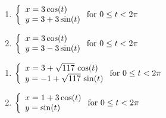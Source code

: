 \documentclass{ximera}
\begin{document}
\begin{multicols}{2}

\begin{enumerate}

\setcounter{enumi}{\value{HW}}

\item   ${\displaystyle \left\{ \begin{array}{l} x = 3\cos(t) \\ y = 3 + 3\sin(t)  \end{array} \right. \vspace{.25in} \mbox{for } 0 \leq t < 2\pi}$

\item   ${\displaystyle \left\{ \begin{array}{l} x = 3\cos(t) \\ y = 3 - 3\sin(t)  \end{array} \right. \vspace{.25in} \mbox{for } 0 \leq t < 2\pi }$

\setcounter{HW}{\value{enumi}}

\end{enumerate}

\end{multicols}



\begin{multicols}{2}

\begin{enumerate}

\setcounter{enumi}{\value{HW}}
\item   ${\displaystyle \left\{ \begin{array}{l} x = 3+\sqrt{117} \, \cos(t) \\ y = -1 + \sqrt{117} \, \sin(t)  \end{array} \right. \vspace{.25in} \mbox{for } 0 \leq t < 2\pi}$
\item   ${\displaystyle \left\{ \begin{array}{l} x = 1+3\cos(t) \\ y = \sin(t)  \end{array} \right. \vspace{.25in} \mbox{for } 0 \leq t < 2\pi}$

\setcounter{HW}{\value{enumi}}

\end{enumerate}

\end{multicols}
\end{document}

